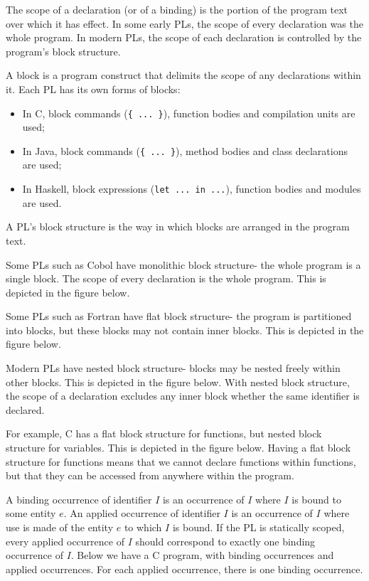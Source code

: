 \documentclass[a4paper, openany]{memoir}
\begin{document}
The scope of a declaration (or of a binding) is the portion of the program text over which it has effect. In some early PLs, the scope of every declaration was the whole program. In modern PLs, the scope of each declaration is controlled by the program's block structure.

A block is a program construct that delimits the scope of any declarations within it. Each PL has its own forms of blocks:
\begin{itemize}
    \item In C, block commands (\texttt{\{ ... \}}), function bodies and compilation units are used;
    \item In Java, block commands (\texttt{\{ ... \}}), method bodies and class declarations are used;
    \item In Haskell, block expressions (\texttt{let ... in ...}), function bodies and modules are used.
\end{itemize}
A PL's block structure is the way in which blocks are arranged in the program text.

Some PLs such as Cobol have monolithic block structure- the whole program is a single block. The scope of every declaration is the whole program. This is depicted in the figure below.

Some PLs such as Fortran have flat block structure- the program is partitioned into blocks, but these blocks may not contain inner blocks. This is depicted in the figure below.

Modern PLs have nested block structure- blocks may be nested freely within other blocks. This is depicted in the figure below.
With nested block structure, the scope of a declaration excludes any inner block whether the same identifier is declared.

For example, C has a flat block structure for functions, but nested block structure for variables. This is depicted in the figure below.
Having a flat block structure for functions means that we cannot declare functions within functions, but that they can be accessed from anywhere within the program.

A binding occurrence of identifier $I$ is an occurrence of $I$ where $I$ is bound to some entity $e$. An applied occurrence of identifier $I$ is an occurrence of $I$ where use is made of the entity $e$ to which $I$ is bound. If the PL is statically scoped, every applied occurrence of $I$ should correspond to exactly one binding occurrence of $I$. Below we have a C program, with binding occurrences and applied occurrences.
For each applied occurrence, there is one binding occurrence.
\end{document}
